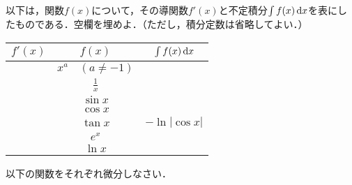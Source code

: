 \newpage
\begin{questions}
	\question
	以下は，関数$f(x)$について，その導関数$f'(x)$と不定積分$\int f(x)\,\mathrm{d} x$を表にしたものである．空欄を埋めよ．（ただし，積分定数は省略してよい．）
	\begin{table}[!h]
		\centering
		\begin{tabular}{c|c|c}
			$f'(x)$ & $f(x)$ & $\int f(x)\,\mathrm{d} x$ \\
			\hline
			\mySpace & $x^a\quad(a \neq -1)$ & \\
			\hline
			& $\displaystyle \frac{1}{x}$ & \mySpace \\
			\hline
			\mySpace & $\sin x$ & \\
			\hline
			& $\cos x$ & \mySpace \\
			\hline
			\mySpace & $\tan x$ & $-\ln\left|\cos x\right|$ \\
			\hline
			& $e^x$ & \mySpace \\
			\hline
			\mySpace & $\ln x$ & \\
		\end{tabular}
	\end{table}
	
	\newpage
	\question
	\setlength\answerlinelength{3in}
	以下の関数をそれぞれ微分しなさい．
\end{questions}
